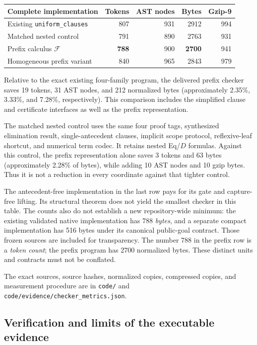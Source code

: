 \documentclass[11pt]{article}
\theoremstyle{definition}\newtheorem{definition}[theorem]{Definition}
\theoremstyle{remark}\newtheorem{remark}[theorem]{Remark}
\newcommand{\F}{\mathcal F}
\newcommand{\code}[1]{\texttt{#1}}
\begin{document}
\begin{center}
\small
\begin{tabular}{lrrrr}
\toprule
Complete implementation & Tokens & AST nodes & Bytes & Gzip-9\\
\midrule
Existing \code{uniform\_clauses} & 807 & 931 & 2912 & 994\\
Matched nested control & 791 & 890 & 2763 & 931\\
Prefix calculus $\F$ & \textbf{788} & 900 & \textbf{2700} & 941\\
Homogeneous prefix variant & 840 & 965 & 2843 & 979\\
\bottomrule
\end{tabular}
\end{center}

Relative to the exact existing four-family program, the delivered prefix
checker saves 19 tokens, 31 AST nodes, and 212 normalized bytes
(approximately 2.35\%, 3.33\%, and 7.28\%, respectively). This comparison
includes the simplified clause and certificate interfaces as well as the
prefix representation.

The matched nested control uses the same four proof tags, synthesized
elimination result, single-antecedent clauses, implicit scope protocol,
reflexive-leaf shortcut, and numerical term codec. It retains nested
Eq/$D$ formulas. Against this control, the prefix representation alone
saves 3 tokens and 63 bytes (approximately 2.28\% of bytes), while adding
10 AST nodes and 10 gzip bytes. Thus it is not a reduction in every
coordinate against that tighter control.

The antecedent-free implementation in the last row pays for its gate and
capture-free lifting. Its structural theorem does not yield the smallest
checker in this table. The counts also do not establish a new repository-wide
minimum: the existing validated native implementation has 788 \emph{bytes},
and a separate compact implementation has 516 bytes under its canonical
public-goal contract. Those frozen sources are included for transparency.
The number 788 in the prefix row is a \emph{token count}; the prefix
program has 2700 normalized bytes. These distinct units and contracts
must not be conflated.

The exact sources, source hashes, normalized copies, compressed copies,
and measurement procedure are in \code{code/} and
\code{code/evidence/checker\_metrics.json}.


\subsection{Verification and limits of the executable evidence}
\end{document}
